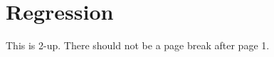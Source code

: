 \documentclass[a4paper,\myClassOptions]{article}
\begin{document}
\tableofcontents
\listoffigures

\section{Regression}
This is 2-up. There should not be a page break after page 1.







\def\foo{2-4}


\end{document}
